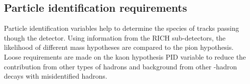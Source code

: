 




% 





% 




% 








\clearpage


\subsection{Particle identification requirements}
\label{sec:pidrequirements}
Particle identification variables help to determine the species of tracks passing though the \lhcb detector. Using information from the RICH sub-detectors, the likelihood of different mass hypotheses are compared to the pion hypothesis. Loose requirements are made on the kaon hypothesis PID variable to reduce the contribution from other types of hadrons and background from other \bquark-hadron decays with misidentified hadrons. 

